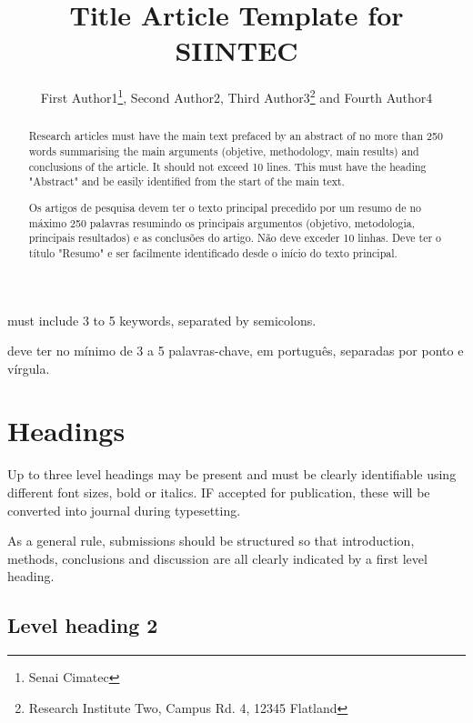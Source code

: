 \documentclass{article}
\title{Title Article Template for SIINTEC}
\author{%
    First Author1\thanks{Senai Cimatec}, %
    Second Author2\samethanks , %
    Third Author3\thanks{Research Institute Two, Campus Rd. 4, 12345 Flatland} and %
    Fourth Author4\samethanks%
\protect\footnotemark[2]}
\date{}
\begin{document}
%
%
%
\maketitleblock
%
\begin{abstract}
  Research articles must have the main text prefaced by an abstract of no more than 250 words summarising the main arguments (objetive, methodology, main results) and conclusions of the article. It should not exceed 10 lines.
  This must have the heading "Abstract" and be easily identified from the start of the main text.
\end{abstract}
%
\begin{keywords}
  must include 3 to 5 keywords, separated by semicolons.
\end{keywords}
%
\begin{abstract}
  Os artigos de pesquisa devem ter o texto principal precedido por um resumo de no máximo 250 palavras resumindo os principais argumentos (objetivo, metodologia, principais resultados) e as conclusões do artigo. Não deve exceder 10 linhas.
  Deve ter o título "Resumo" e ser facilmente identificado desde o início do texto principal.
\end{abstract}
%
\begin{keywords}
  deve ter no mínimo de 3 a 5 palavras-chave, em português, separadas por ponto e vírgula.
\end{keywords}
%
\saythanks{}
%
\section{Headings}\label{sec:headings}

Up to three level headings may be present and must be clearly identifiable
using different font sizes, bold or italics. IF accepted for publication,
these will be converted into journal during typesetting.

As a general rule, submissions should be structured so that introduction,
methods, conclusions and discussion are all clearly indicated by a first level heading.

\subsection{Level heading 2}
\end{document}
